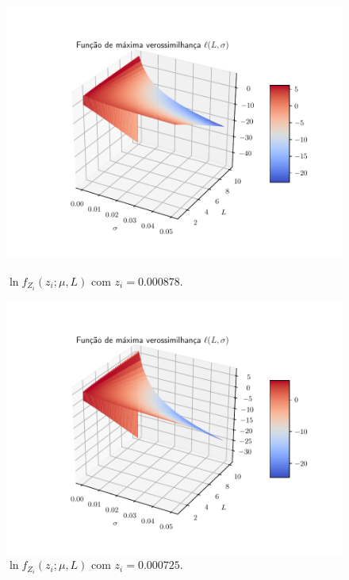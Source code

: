 \documentclass[journal,article,submit,moreauthors,pdftex]{Definitions/mdpi}
\begin{document}
\begin{figure}[hbt]
  \includegraphics[width=\linewidth]{funv_max_ver_j_50_flevoland.pdf}
  	\caption{$\ln f_{Z_{i}}(z_{i};\mu,L)$ com $z_i= 0.000878$.}\label{funv_max_ver_j_50_flevoland}
\endminipage\hfill
{}
  \includegraphics[width=\linewidth]{funv_max_ver_j_60_flevoland.pdf}
		\caption{$\ln f_{Z_{i}}(z_{i};\mu,L)$ com  $z_i= 0.000725$.}\label{funv_max_ver_j_60_flevoland}
\endminipage\hfill
\centering
\vspace{0.5cm}

\end{figure}
\end{document}
